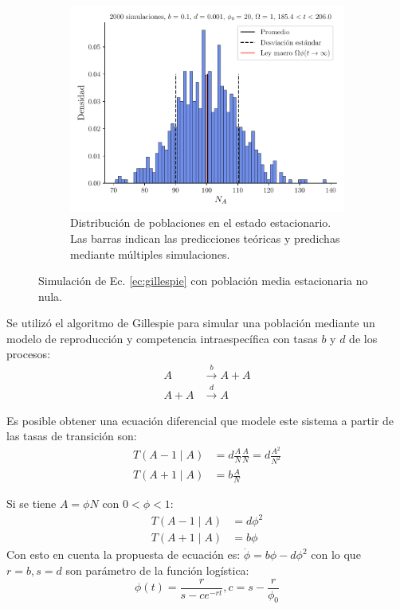 \documentclass[twocolumn,aps,prl]{revtex4-1}
\begin{document}
\begin{figure}[ht!]
\begin{subfigure}[b]{0.49\linewidth}
      \includegraphics[width = 0.999\textwidth]{figuras/ex03-b-SinCota.pdf}
      \caption{Distribución de poblaciones en el estado estacionario. Las barras indican las predicciones teóricas y predichas mediante múltiples simulaciones.}
      \label{fig:figuras/ex03-b-SinCota}
  \end{subfigure}\quad
  \caption{Simulación de Ec. \ref{ec:gillespie} con población media estacionaria no nula.}
  \label{fig:figuras/ex03-stat}
\end{figure}

Se utilizó el algoritmo de Gillespie para simular una población mediante un modelo de reproducción y competencia intraespecífica con tasas $b$ y $d$ de los procesos:
\begin{equation}\label{ec:gillespie}
  \begin{aligned}
    A & \stackrel{b}{\rightarrow} A+A \\
    A+A & \stackrel{d}{\rightarrow} A
  \end{aligned}
\end{equation}

Es posible obtener una ecuación diferencial que modele este sistema a partir de las tasas de transición son:
\begin{equation}
  \begin{aligned}
    T(A-1 \mid A) &= d \frac{A}{N} \frac{A}{N} 
    = d\frac{A^2}{N^2} \\
    T(A+1 \mid A) &= b \frac{A}{N}
  \end{aligned}
\end{equation}

Si se tiene $A=\phi N$ con $0<\phi<1$:
\begin{equation}
  \begin{aligned}
    T(A-1 \mid A) &= d \phi^{2} \\
    T(A+1 \mid A) &= b \phi
  \end{aligned}
\end{equation}
Con esto en cuenta la propuesta de ecuación es:
  $\dot{\phi}=b \phi-d \phi^{2}$
con lo que $r=b, s=d$ son parámetro de la función logística:
\begin{equation}
  \phi(t)=\frac{r}{s-c e^{-r t}}, c=s-\frac{r}{\phi_{0}}
\end{equation}
\end{document}
